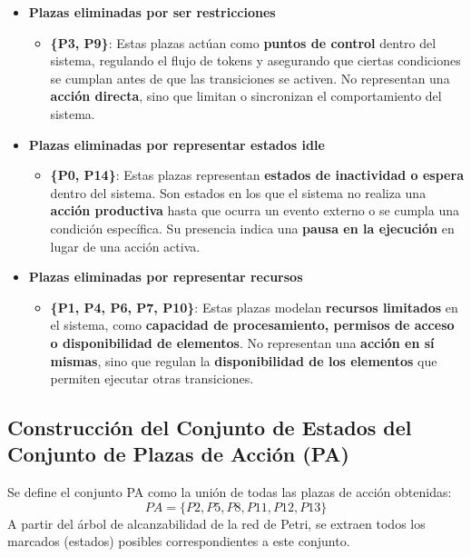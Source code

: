 \documentclass[12pt]{article}
\begin{document}
\begin{itemize}
    \item \textbf{Plazas eliminadas por ser restricciones}
    \begin{itemize}
        \item \textbf{\{P3, P9\}}: Estas plazas actúan como \textbf{puntos de control} dentro del sistema, regulando el flujo de tokens y asegurando que ciertas condiciones se cumplan antes de que las transiciones se activen. No representan una \textbf{acción directa}, sino que limitan o sincronizan el comportamiento del sistema.
    \end{itemize}

    \item \textbf{Plazas eliminadas por representar estados idle}
    \begin{itemize}
        \item \textbf{\{P0, P14\}}: Estas plazas representan \textbf{estados de inactividad o espera} dentro del sistema. Son estados en los que el sistema no realiza una \textbf{acción productiva} hasta que ocurra un evento externo o se cumpla una condición específica. Su presencia indica una \textbf{pausa en la ejecución} en lugar de una acción activa.
    \end{itemize}

    \item \textbf{Plazas eliminadas por representar recursos}
    \begin{itemize}
        \item \textbf{\{P1, P4, P6, P7, P10\}}: Estas plazas modelan \textbf{recursos limitados} en el sistema, como \textbf{capacidad de procesamiento, permisos de acceso o disponibilidad de elementos}. No representan una \textbf{acción en sí mismas}, sino que regulan la \textbf{disponibilidad de los elementos} que permiten ejecutar otras transiciones.
    \end{itemize}
\end{itemize}


\subsection{Construcción del Conjunto de Estados del Conjunto de Plazas de Acción (PA)}
Se define el conjunto PA como la unión de todas las plazas de acción obtenidas:
\[
PA = \{P2, P5, P8, P11, P12, P13\}
\]
A partir del árbol de alcanzabilidad de la red de Petri, se extraen todos los marcados (estados) posibles correspondientes a este conjunto.
\end{document}
